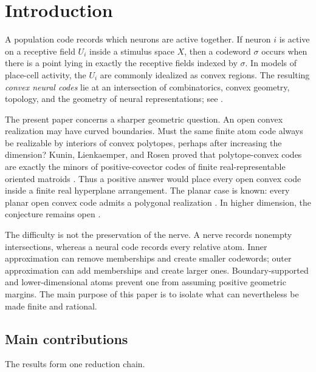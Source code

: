 \section{Introduction}
\label{sec:introduction}

A population code records which neurons are active together.  If neuron $i$ is active on a receptive field $U_i$ inside a stimulus space $X$, then a codeword $\sigma$ occurs when there is a point lying in exactly the receptive fields indexed by $\sigma$.  In models of place-cell activity, the $U_i$ are commonly idealized as convex regions.  The resulting \emph{convex neural codes} lie at an intersection of combinatorics, convex geometry, topology, and the geometry of neural representations; see \citet{CurtoEtAl2017,CruzEtAl2019,ChenFrickShiu2019}.

The present paper concerns a sharper geometric question.  An open convex realization may have curved boundaries.  Must the same finite atom code always be realizable by interiors of convex polytopes, perhaps after increasing the dimension?  Kunin, Lienkaemper, and Rosen proved that polytope-convex codes are exactly the minors of positive-covector codes of finite real-representable oriented matroids \cite{KuninLienkaemperRosen2023}.  Thus a positive answer would place every open convex code inside a finite real hyperplane arrangement.  The planar case is known: every planar open convex code admits a polygonal realization \cite{BukhJeffs2023}.  In higher dimension, the conjecture remains open \cite{KuninLienkaemperRosen2023,JeffsTrang2025}.

The difficulty is not the preservation of the nerve.  A nerve records nonempty intersections, whereas a neural code records every relative atom.  Inner approximation can remove memberships and create smaller codewords; outer approximation can add memberships and create larger ones.  Boundary-supported and lower-dimensional atoms prevent one from assuming positive geometric margins.  The main purpose of this paper is to isolate what can nevertheless be made finite and rational.

\subsection*{Main contributions}
The results form one reduction chain.

